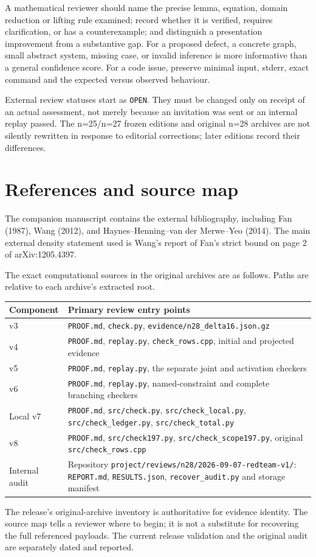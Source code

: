 \documentclass[11pt,a4paper]{article}
\begin{document}
A mathematical reviewer should name the precise lemma, equation, domain reduction or lifting rule examined; record whether it is verified, requires clarification, or has a counterexample; and distinguish a presentation improvement from a substantive gap. For a proposed defect, a concrete graph, small abstract system, missing case, or invalid inference is more informative than a general confidence score. For a code issue, preserve minimal input, stderr, exact command and the expected versus observed behaviour.

External review statuses start as \texttt{OPEN}. They must be changed only on receipt of an actual assessment, not merely because an invitation was sent or an internal replay passed. The n=25/n=27 frozen editions and original n=28 archives are not silently rewritten in response to editorial corrections; later editions record their differences.

\section{References and source map}
The companion manuscript contains the external bibliography, including Fan (1987), Wang (2012), and Haynes--Henning--van der Merwe--Yeo (2014). The main external density statement used is Wang's report of Fan's strict bound on page 2 of arXiv:1205.4397.

The exact computational sources in the original archives are as follows. Paths are relative to each archive's extracted root.
\begin{center}\small\begin{tabular}{lp{112mm}}\toprule
Component&Primary review entry points\\\midrule
v3&\texttt{PROOF.md}, \texttt{check.py}, \texttt{evidence/n28\_delta16.json.gz}\\
v4&\texttt{PROOF.md}, \texttt{replay.py}, \texttt{check\_rows.cpp}, initial and projected evidence\\
v5&\texttt{PROOF.md}, \texttt{replay.py}, the separate joint and activation checkers\\
v6&\texttt{PROOF.md}, \texttt{replay.py}, named-constraint and complete branching checkers\\
Local v7&\texttt{PROOF.md}, \texttt{src/check.py}, \texttt{src/check\_local.py}, \texttt{src/check\_ledger.py}, \texttt{src/check\_total.py}\\
v8&\texttt{PROOF.md}, \texttt{src/check197.py}, \texttt{src/check\_scope197.py}, original \texttt{src/check\_rows.cpp}\\
Internal audit&Repository \texttt{project/reviews/n28/2026-09-07-redteam-v1/}: \texttt{REPORT.md}, \texttt{RESULTS.json}, \texttt{recover\_audit.py} and storage manifest\\\bottomrule
\end{tabular}\end{center}
The release's original-archive inventory is authoritative for evidence identity. The source map tells a reviewer where to begin; it is not a substitute for recovering the full referenced payloads. The current release validation and the original audit are separately dated and reported.
\end{document}
